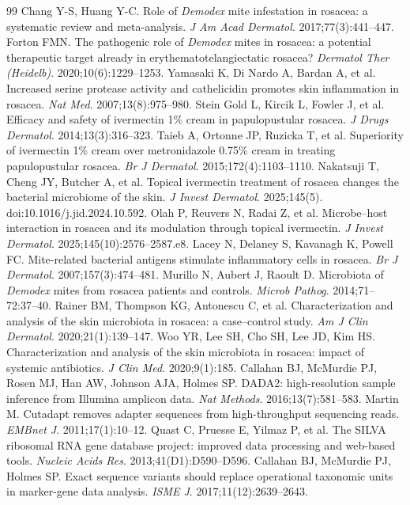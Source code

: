 \documentclass[11pt]{article}
\newcommand{\demodex}{\textit{Demodex}}
\begin{document}
\begin{thebibliography}{99}
 Chang Y-S, Huang Y-C. Role of \demodex{} mite infestation in
  rosacea: a systematic review and meta-analysis. \textit{J Am Acad Dermatol}.
  2017;77(3):441--447.
 Forton FMN. The pathogenic role of \demodex{} mites in
  rosacea: a potential therapeutic target already in erythematotelangiectatic
  rosacea? \textit{Dermatol Ther (Heidelb)}. 2020;10(6):1229--1253.
 Yamasaki K, Di Nardo A, Bardan A, et al. Increased serine
  protease activity and cathelicidin promotes skin inflammation in rosacea.
  \textit{Nat Med}. 2007;13(8):975--980.
 Stein Gold L, Kircik L, Fowler J, et al. Efficacy and
  safety of ivermectin 1\% cream in papulopustular rosacea. \textit{J Drugs
  Dermatol}. 2014;13(3):316--323.
 Taieb A, Ortonne JP, Ruzicka T, et al. Superiority of
  ivermectin 1\% cream over metronidazole 0.75\% cream in treating
  papulopustular rosacea. \textit{Br J Dermatol}. 2015;172(4):1103--1110.
 Nakatsuji T, Cheng JY, Butcher A, et al. Topical
  ivermectin treatment of rosacea changes the bacterial microbiome of the skin.
  \textit{J Invest Dermatol}. 2025;145(5). doi:10.1016/j.jid.2024.10.592.
 Olah P, Reuvers N, Radai Z, et al. Microbe--host interaction
  in rosacea and its modulation through topical ivermectin. \textit{J Invest
  Dermatol}. 2025;145(10):2576--2587.e8.
 Lacey N, Delaney S, Kavanagh K, Powell FC. Mite-related
  bacterial antigens stimulate inflammatory cells in rosacea. \textit{Br J
  Dermatol}. 2007;157(3):474--481.
 Murillo N, Aubert J, Raoult D. Microbiota of \demodex{}
  mites from rosacea patients and controls. \textit{Microb Pathog}.
  2014;71--72:37--40.
 Rainer BM, Thompson KG, Antonescu C, et al.
  Characterization and analysis of the skin microbiota in rosacea: a
  case--control study. \textit{Am J Clin Dermatol}. 2020;21(1):139--147.
 Woo YR, Lee SH, Cho SH, Lee JD, Kim HS. Characterization and
  analysis of the skin microbiota in rosacea: impact of systemic antibiotics.
  \textit{J Clin Med}. 2020;9(1):185.
 Callahan BJ, McMurdie PJ, Rosen MJ, Han AW, Johnson AJA,
  Holmes SP. DADA2: high-resolution sample inference from Illumina amplicon
  data. \textit{Nat Methods}. 2016;13(7):581--583.
 Martin M. Cutadapt removes adapter sequences from
  high-throughput sequencing reads. \textit{EMBnet J}. 2011;17(1):10--12.
 Quast C, Pruesse E, Yilmaz P, et al. The SILVA ribosomal RNA
  gene database project: improved data processing and web-based tools.
  \textit{Nucleic Acids Res}. 2013;41(D1):D590--D596.
 Callahan BJ, McMurdie PJ, Holmes SP. Exact sequence
  variants should replace operational taxonomic units in marker-gene data
  analysis. \textit{ISME J}. 2017;11(12):2639--2643.
\end{thebibliography}
\end{document}
